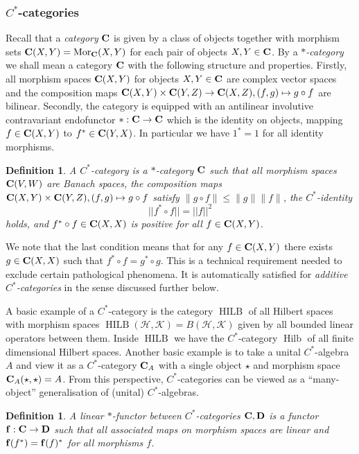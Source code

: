 \documentclass[a4paper]{amsart}
\newcommand*{\Hc}{\mathcal{H}}
\newcommand*{\K}{\mathcal{K}}
\newcommand*{\Bf}{{\bf f}}
\newcommand*{\BC}{{\bf C}}
\newcommand*{\BD}{{\bf D}}
\DeclareMathOperator{\Mor}{Mor}
\DeclareMathOperator{\Hilb}{Hilb}
\DeclareMathOperator{\HILB}{HILB}
\numberwithin{equation}{section}
\theoremstyle{change}
\newtheorem{definition}[theorem]{Definition}
\begin{document}
\subsubsection{$ C^* $-categories} 

Recall that a \emph{category} $ \BC $ is given by a class of objects together with morphism sets $ \BC(X,Y) = \Mor_\BC(X,Y) $ for each pair of objects $ X, Y \in \BC $. By a \emph{$ * $-category} we shall mean a category $ \BC $ with the following structure and properties. Firstly, all morphism spaces $ \BC(X,Y) $ for objects $ X, Y \in \BC $ are complex vector spaces and 
the composition maps $ \BC(X,Y) \times \BC(Y, Z) \rightarrow \BC(X, Z), (f,g) \mapsto g \circ f $ are bilinear. Secondly, the category is equipped with an antilinear involutive contravariant endofunctor $ *: \BC \rightarrow \BC $ which is the identity on objects, mapping $ f \in \BC(X, Y) $ to $ f^* \in \BC(Y, X) $. In particular we have $ 1^* = 1 $ for all identity morphisms. 

\begin{definition}
A \emph{$ C^* $-category} is a $ * $-category $ \BC $ such that all morphism spaces $ \BC(V,W) $ are Banach spaces, the composition 
maps $ \BC(X,Y) \times \BC(Y, Z), (f,g) \mapsto g \circ f $ satisfy $ \|g \circ f\| \leq \|g\| \|f \| $, the $ C^* $-identity 
$$
||f^* \circ f || = ||f ||^2 
$$ 
holds, and $ f^* \circ f \in \BC(X,X) $ is positive for all $ f \in \BC(X, Y) $. 
\end{definition} 

We note that the last condition means that for any $ f \in \BC(X,Y) $ there exists $ g \in \BC(X,X) $ such that $ f^* \circ f = g^* \circ g $. This is a technical requirement needed to exclude certain pathological phenomena. 
It is automatically satisfied for \emph{additive $ C^* $-categories} in the sense discussed further below. 

A basic example of a $ C^* $-category is the category $ \HILB $ of all Hilbert spaces with morphism spaces $ \HILB(\Hc,\K) = B(\Hc,\K) $ given by all bounded linear operators 
between them. Inside $ \HILB $ we have the $ C^* $-category $ \Hilb $ of all finite dimensional Hilbert spaces. Another basic example is to take a unital $ C^* $-algebra $ A $ and view it as a $ C^* $-category $ \BC_A $ with a single object $ \star $ and 
morphism space $ \BC_A(\star, \star) = A $. From this perspective, $ C^* $-categories can be viewed as a ``many-object'' generalisation of (unital) $ C^* $-algebras. 

\begin{definition}
A linear $ * $-functor between $ C^* $-categories $ \BC, \BD $ is a functor $ \Bf: \BC \rightarrow \BD $ such that all associated maps on morphism spaces are linear and $ \Bf(f^*) = \Bf(f)^* $ for all morphisms $ f $. 
\end{definition} 
\end{document}
